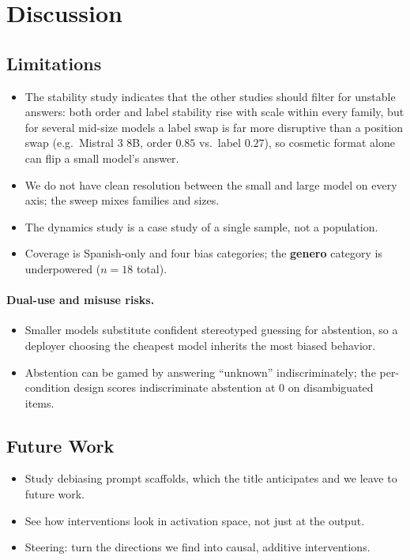 \section{Discussion}
\label{sec:discussion}

\subsection{Limitations}
\begin{itemize}[leftmargin=*,topsep=2pt,itemsep=1pt]
  \item The stability study indicates that the other studies should filter for unstable
    answers: both order and label stability rise with scale within every family, but for
    several mid-size models a label swap is far more disruptive than a position swap
    (e.g.\ Mistral 3 8B, order $0.85$ vs.\ label $0.27$), so cosmetic format alone can flip
    a small model's answer.
  \item We do not have clean resolution between the small and large model on every axis;
    the sweep mixes families and sizes.
  \item The dynamics study is a case study of a single sample, not a population.
  \item Coverage is Spanish-only and four bias categories; the \textbf{genero} category
    is underpowered ($n{=}18$ total).
\end{itemize}

\paragraph{Dual-use and misuse risks.}
\begin{itemize}[leftmargin=*,topsep=2pt,itemsep=1pt]
  \item Smaller models substitute confident stereotyped guessing for abstention, so a
    deployer choosing the cheapest model inherits the most biased behavior.
  \item Abstention can be gamed by answering ``unknown'' indiscriminately; the
    per-condition design scores indiscriminate abstention at $0$ on disambiguated items.
\end{itemize}

\subsection{Future Work}
\begin{itemize}[leftmargin=*,topsep=2pt,itemsep=1pt]
  \item Study debiasing prompt scaffolds, which the title anticipates and we leave to
    future work.
  \item See how interventions look in activation space, not just at the output.
  \item Steering: turn the directions we find into causal, additive interventions.
\end{itemize}
